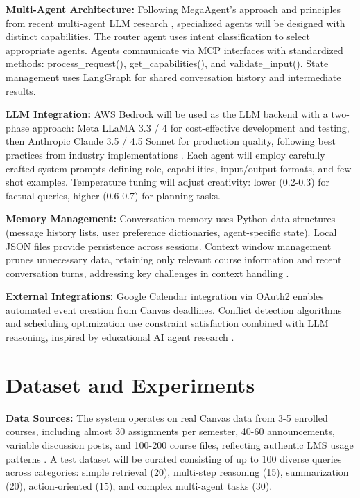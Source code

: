 \documentclass{article}
\begin{document}
\textbf{Multi-Agent Architecture:} Following MegaAgent's approach \cite{wang2025megaagent} and principles from recent multi-agent LLM research \cite{chen2024llmma, autoscaling2025mas}, specialized agents will be designed with distinct capabilities. The router agent uses intent classification to select appropriate agents. Agents communicate via MCP interfaces \cite{mcp2025landscape, mcpagentic2025} with standardized methods: process\_request(), get\_capabilities(), and validate\_input(). State management uses LangGraph for shared conversation history and intermediate results.

\textbf{LLM Integration:} AWS Bedrock will be used as the LLM backend with a two-phase approach: Meta LLaMA 3.3 / 4 for cost-effective development and testing, then Anthropic Claude 3.5 / 4.5 Sonnet for production quality, following best practices from industry implementations \cite{anthropic2025multiagent}. Each agent will employ carefully crafted system prompts defining role, capabilities, input/output formats, and few-shot examples. Temperature tuning will adjust creativity: lower (0.2-0.3) for factual queries, higher (0.6-0.7) for planning tasks.

\textbf{Memory Management:} Conversation memory uses Python data structures (message history lists, user preference dictionaries, agent-specific state). Local JSON files provide persistence across sessions. Context window management prunes unnecessary data, retaining only relevant course information and recent conversation turns, addressing key challenges in context handling \cite{mcpenhance2025}.

\textbf{External Integrations:} Google Calendar integration via OAuth2 enables automated event creation from Canvas deadlines. Conflict detection algorithms and scheduling optimization use constraint satisfaction combined with LLM reasoning, inspired by educational AI agent research \cite{teachable2025agents, education2025agentic}.

\section{Dataset and Experiments}
\textbf{Data Sources:} The system operates on real Canvas data from 3-5 enrolled courses, including almost 30 assignments per semester, 40-60 announcements, variable discussion posts, and 100-200 course files, reflecting authentic LMS usage patterns \cite{lms2025ai, genai2024higher}. A test dataset will be curated consisting of up to 100 diverse queries across categories: simple retrieval (20), multi-step reasoning (15), summarization (20), action-oriented (15), and complex multi-agent tasks (30).
\end{document}
